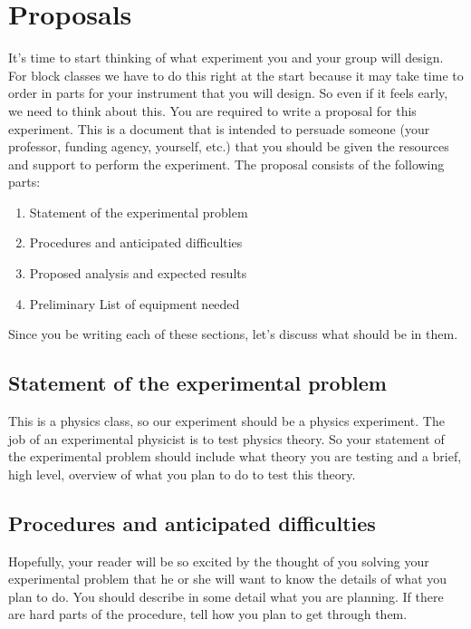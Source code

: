 \section{Proposals}

It's time to start thinking of what experiment you and your group will design. For block classes we have to do this right at the start because it may take time to order in parts for your instrument that you will design. So even if it feels early, we need to think about this. 
You are required to write a proposal for this experiment. This is a document that is intended to persuade someone (your professor,  funding agency, yourself, etc.) that you should be given the resources and support to perform the experiment. The proposal consists of the following parts:

\begin{enumerate}
	\item Statement of the experimental problem
	
	\item Procedures and anticipated difficulties
	
	\item Proposed analysis and expected results
	
	\item Preliminary List of equipment needed
\end{enumerate}

Since you be writing each of these sections, let's discuss what should be in them.

\subsection{Statement of the experimental problem}

This is a physics class, so our experiment should be a physics experiment. The job of an experimental physicist is to test physics theory. So your statement of the experimental problem should include what theory you are testing and a brief, high level, overview of what you plan to do to test this theory.

\subsection{Procedures and anticipated difficulties}

Hopefully, your reader will be so excited by the thought of you solving your experimental problem that he or she will want to know the details of what you plan to do. You should describe in some detail what you are planning. If there are hard parts of the procedure, tell how you plan to get through them.

